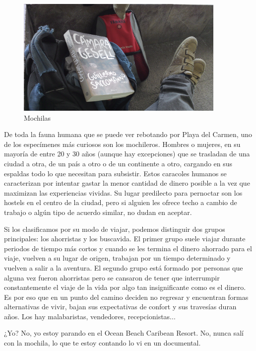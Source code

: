 \documentclass[11pt,twoside,openright,a6paper]{book}
\begin{document}
\begin{figure}[H]
  \centering
    \includegraphics[width=0.9\textwidth]{fotos/2013/mochila}
  \caption{Mochilas}
  \label{Mochilas}
\end{figure}

De toda la fauna humana que se puede ver rebotando por Playa del Carmen, uno
de los especímenes más curiosos son los mochileros. Hombres o mujeres,
en su mayoría de entre 20 y 30 años (aunque hay excepciones) que se
trasladan de una ciudad a otra, de un país a otro o de un continente a
otro, cargando en sus espaldas todo lo que necesitan para subsistir. Estos
caracoles humanos se caracterizan por intentar gastar la menor cantidad de
dinero posible a la vez que maximizan las experiencias vividas. Su lugar
predilecto para pernoctar son los hostels en el centro de la ciudad, pero
si alguien les ofrece techo a cambio de trabajo o algún tipo de acuerdo
similar, no dudan en aceptar.

Si los clasificamos por su modo de viajar, podemos distinguir dos grupos
principales: los ahorristas y los buscavida. El primer grupo suele viajar
durante periodos de tiempo más cortos y cuando se les termina el dinero
ahorrado para el viaje, vuelven a su lugar de origen, trabajan por un
tiempo determinado y vuelven a salir a la aventura. El segundo grupo está
formado por personas que alguna vez fueron ahorristas pero se cansaron
de tener que interrumpir constantemente el viaje de la vida por algo tan
insignificante como es el dinero. Es por eso que en un punto del camino
deciden no regresar y encuentran formas alternativas de vivir, bajan sus
expectativas de confort y sus travesías duran años. Los hay malabaristas,
vendedores, recepcionistas...

¿Yo? No, yo estoy parando en el Ocean Beach Caribean Resort. No, nunca
salí con la mochila, lo que te estoy contando lo vi en un documental.
\end{document}
